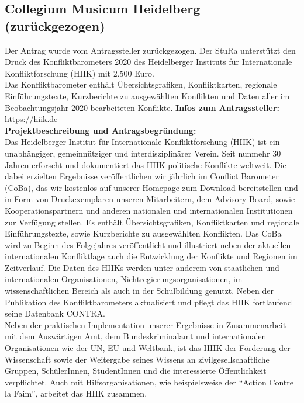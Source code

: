 \subsection{Collegium Musicum Heidelberg (zurückgezogen)}
Der Antrag wurde vom Antragssteller zurückgezogen.
{
    Der StuRa unterstützt den Druck des Konfliktbarometers 2020 des Heidelberger Instituts für Internationale Konfliktforschung (HIIK) mit 2.500 Euro.\\
    Das Konfliktbarometer enthält Übersichtsgrafiken, Konfliktkarten, regionale Einführungstexte, Kurzberichte zu ausgewählten Konflikten und Daten aller im Beobachtungsjahr 2020 bearbeiteten Konflikte.
}{
    \textbf{Infos zum Antragssteller:}\\
    \url{https://hiik.de}\\[1em]
    \textbf{Projektbeschreibung und Antragsbegründung:}\\
    Das Heidelberger Institut für Internationale Konfliktforschung (HIIK) ist ein unabhängiger, gemeinnütziger und interdisziplinärer Verein. Seit nunmehr 30 Jahren erforscht und dokumentiert das HIIK politische Konflikte weltweit. Die dabei erzielten Ergebnisse veröffentlichen wir jährlich im Conflict Barometer (CoBa), das wir kostenlos auf unserer Homepage zum Download bereitstellen und in Form von Druckexemplaren unseren Mitarbeitern, dem Advisory Board, sowie Kooperationspartnern und anderen nationalen und internationalen Institutionen zur Verfügung stellen. Es enthält Übersichtsgrafiken, Konfliktkarten und regionale Einführungstexte, sowie Kurzberichte zu ausgewählten Konflikten. Das CoBa wird zu Beginn des Folgejahres veröffentlicht und illustriert neben der aktuellen internationalen Konfliktlage auch die Entwicklung der Konflikte und Regionen im Zeitverlauf. Die Daten des HIIKs werden unter anderem von staatlichen und internationalen Organisationen, Nichtregierungsorganisationen, im wissenschaftlichen Bereich als auch in der Schulbildung genutzt. Neben der Publikation des Konfliktbarometers aktualisiert und pflegt das HIIK fortlaufend seine Datenbank CONTRA.\\
    Neben der praktischen Implementation unserer Ergebnisse in Zusammenarbeit mit dem Auswärtigen Amt, dem Bundeskriminalamt und internationalen Organisationen wie der UN, EU und Weltbank, ist das HIIK der Förderung der Wissenschaft sowie der Weitergabe seines Wissens an zivilgesellschaftliche Gruppen, SchülerInnen, StudentInnen und die interessierte Öffentlichkeit verpflichtet. Auch mit Hilfsorganisationen, wie beispielsweise der “Action Contre la Faim”, arbeitet das HIIK zusammen.\\
}
